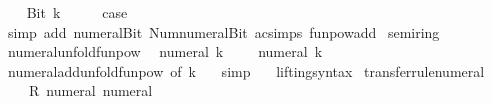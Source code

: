 \begin{isabellebody}
\isamarkupfalse%
\isanewline
\ \ \isamarkupfalse%
\ {\isacharparenleft}{\kern0pt}Bit{}\ k{\isacharparenright}{\kern0pt}\isanewline
\ \ \isamarkupfalse%
\ \isamarkupfalse%
\ {\isacharquery}{\kern0pt}case\isanewline
\ \ \ \ \isamarkupfalse%
\ {\isacharparenleft}{\kern0pt}simp\ add{\isacharcolon}{\kern0pt}\ numeral{\isacharunderscore}{\kern0pt}Bit{}\ Num{\isachardot}{\kern0pt}numeral{\isacharunderscore}{\kern0pt}Bit{}\ ac{\isacharunderscore}{\kern0pt}simps\ funpow{\isacharunderscore}{\kern0pt}add{\isacharparenright}{\kern0pt}\isanewline
{}\isamarkupfalse%
%
\endisatagproof
{\isafoldproof}%
%
\isadelimproof
\isanewline
%
\endisadelimproof
\isanewline
{}\isamarkupfalse%
\isanewline
\isanewline
{}\isamarkupfalse%
\ semiring{\isacharunderscore}{\kern0pt}{}\isanewline
{}\isanewline
\isanewline
{}\isamarkupfalse%
\ numeral{\isacharunderscore}{\kern0pt}unfold{\isacharunderscore}{\kern0pt}funpow{\isacharcolon}{\kern0pt}\isanewline
\ \ {\isacartoucheopen}numeral\ k\ {\isacharequal}{\kern0pt}\ {\isacharparenleft}{\kern0pt}{\isacharparenleft}{\kern0pt}{\isacharplus}{\kern0pt}{\isacharparenright}{\kern0pt}\ {}\ {\isacharcircum}{\kern0pt}{\isacharcircum}{\kern0pt}\ numeral\ k{\isacharparenright}{\kern0pt}\ {}{\isacartoucheclose}\isanewline
%
\isadelimproof
\ \ %
\endisadelimproof
%
\isatagproof
{}\isamarkupfalse%
\ numeral{\isacharunderscore}{\kern0pt}add{\isacharunderscore}{\kern0pt}unfold{\isacharunderscore}{\kern0pt}funpow\ {\isacharbrackleft}{\kern0pt}of\ k\ {}{\isacharbrackright}{\kern0pt}\ \isamarkupfalse%
\ simp%
\endisatagproof
{\isafoldproof}%
%
\isadelimproof
\isanewline
%
\endisadelimproof
\isanewline
{}\isamarkupfalse%
\isanewline
\isanewline
{}\isamarkupfalse%
\isanewline
\ \ \ lifting{\isacharunderscore}{\kern0pt}syntax\isanewline
{}\isanewline
\isanewline
{}\isamarkupfalse%
\ transfer{\isacharunderscore}{\kern0pt}rule{\isacharunderscore}{\kern0pt}numeral{\isacharcolon}{\kern0pt}\isanewline
\ \ {\isacartoucheopen}{\isacharparenleft}{\kern0pt}{\isacharparenleft}{\kern0pt}{\isacharequal}{\kern0pt}{\isacharparenright}{\kern0pt}\ {\isacharequal}{\kern0pt}{\isacharequal}{\kern0pt}{\isacharequal}{\kern0pt}{\isachargreater}{\kern0pt}\ R{\isacharparenright}{\kern0pt}\ numeral\ numeral{\isacartoucheclose}\isanewline

\end{isabellebody}
